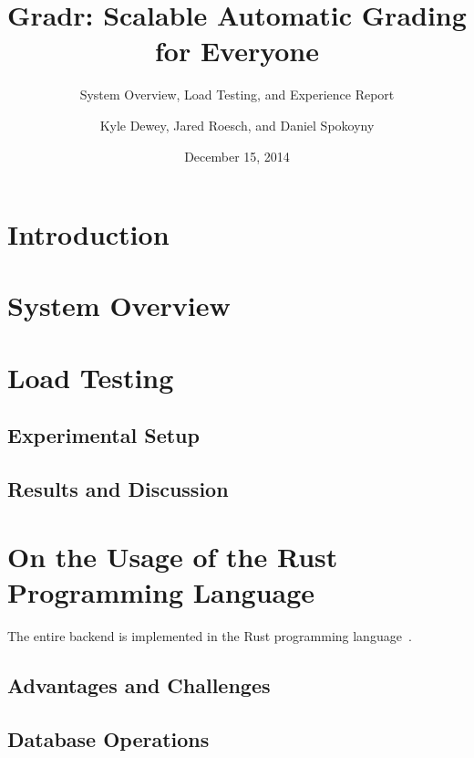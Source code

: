 \documentclass{scrartcl}
\begin{document}
\title{Gradr: Scalable Automatic Grading for Everyone}
\subtitle{System Overview, Load Testing, and Experience Report}
\author{Kyle Dewey, Jared Roesch, and Daniel Spokoyny}
\date{December 15, 2014}

\maketitle

\section{Introduction}
\section{System Overview}
\section{Load Testing}
\subsection{Experimental Setup}
\subsection{Results and Discussion}
\section{On the Usage of the Rust Programming Language}
The entire backend is implemented in the Rust programming language~\cite{rust}.

\subsection{Advantages and Challenges}
\subsection{Database Operations}

{}

\end{document}
